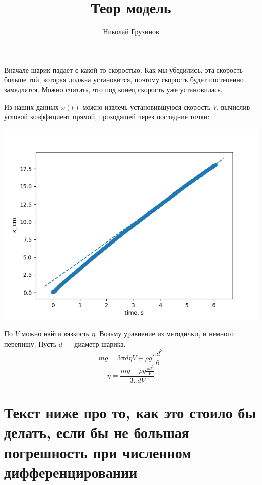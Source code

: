 \documentclass[a4paper, 12pt]{article}
\title{Теор модель}
\author{Николай Грузинов}
\date{}%
\begin{document}
\maketitle

Вначале шарик падает с какой-то скоростью.
Как мы убедились, эта скорость больше той, которая должна установится, поэтому скорость будет постепенно замедлятся.
Можно считать, что под конец скорость уже установилась.

Из наших данных $x(t)$ можно извлечь установившуюся скорость $V$, вычислив угловой коэффициент прямой, проходящей через последние точки:
\begin{center}
\includegraphics[width=0.7\linewidth]{approximation_0.png}
\end{center}

По $V$ можно найти вязкость $\eta$.
Возьму уравнение из методички, и немного перепишу.
Пусть $d$ --- диаметр шарика.
\[ m g = 3 \pi d \eta V+\rho g \frac{\pi d^{3}}{6} \]
\[ \eta = \frac{m g-\rho g \frac{\pi d^{3}}{6} }{3 \pi d V} \]

\section*{Текст ниже про то, как это стоило бы делать, если бы не большая погрешность при численном дифференцировании}
\end{document}
